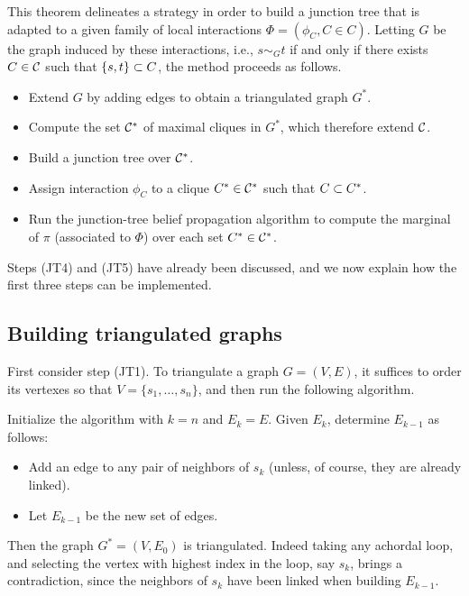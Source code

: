 This theorem delineates a strategy in order to build a junction tree
that is adapted to a given family of local interactions $\Phi =
(\phi_C, C\in C)$. Letting $G$ be the graph induced by these
interactions, i.e., $s\sim_G t$ if and only if there exists $C\in {\mathcal C}$
such that $\{s,t\}\subset C$, the method  proceeds as follows.
\begin{itemize}
\item[(JT1)] Extend $G$ by adding edges to obtain a triangulated graph $G^*$.
\item[(JT2)] Compute the set ${\mathcal C}^*$ of maximal cliques in $G^*$,
  which therefore extend ${\mathcal C}$.
\item[(JT3)] Build a junction tree over ${\mathcal C}^*$.
\item[(JT4)] Assign interaction $\phi_C$ to a clique $C^*\in{\mathcal C}^*$
  such that $C\subset C^*$.
\item[(JT5)] Run the junction-tree belief propagation algorithm to
  compute the marginal of $\pi$ (associated to $\Phi$) over each set
  $C^*\in{\mathcal C}^*$.
\end{itemize}
Steps (JT4) and (JT5) have already been discussed, and we now explain
how the first three steps can be implemented. 

\subsection{Building triangulated graphs}

First consider step (JT1). To triangulate a graph $G = (V, E)$, it
suffices to order its vertexes so that $V = \{s_1, \ldots,
s_n\}$, and then run the following algorithm.

\begin{algorithm} Initialize the algorithm with $k=n$ and
$E_k = E$. Given $E_k$, determine $E_{k-1}$ as follows:
\begin{itemize} 
\item Add an edge to any pair of neighbors of $s_k$ (unless, of
course, they are already linked). 
\item Let $E_{k-1}$ be the new set of
edges.
\end{itemize}
\end{algorithm}

 Then the graph  $G^* = (V, E_0)$ is triangulated. Indeed taking any
 achordal loop, and selecting the vertex with highest
 index in the loop, say $s_k$, brings a contradiction, since the
 neighbors of $s_k$ have been linked when building $E_{k-1}$.

